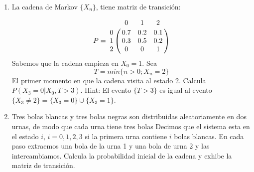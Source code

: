 \documentclass{report}
\begin{document}
\begin{enumerate}
\item La cadena de Markov $\{X_n\}$, tiene matriz de transición:

$$
P = \bordermatrix{~ & 0   & 1   & 2 \cr
                  0 & 0.7 & 0.2 & 0.1 \cr
                  1 & 0.3 & 0.5 & 0.2 \cr
                  2 & 0   & 0   & 1 \cr             
                  }
$$
Sabemos que la cadena empieza en $X_0=1$. Sea
$$
T = min\{n>0; X_n =2\}
$$
El primer momento en que la cadena visita al estado 2. Calcula $P(X_3=0\vert X_0, T>3)$.
Hint: El evento $\{T>3\}$ es igual al evento $\{X_3\neq 2\}=\{X_3=0\}\cup\{X_3=1\}$.
\item Tres bolas blancas y tres bolas negras son distribuidas aleatoriamente en dos urnas, de modo que cada urna tiene tres bolas Decimos que el sistema esta en el estado $i$, $i = 0,1,2,3$ si la primera urna contiene $i$ bolas blancas. En cada paso extraemos una bola de la urna 1 y una bola de urna 2 y las intercambiamos. Calcula la probabilidad inicial de la cadena y exhibe la matriz de transición.

\end{enumerate}
\end{document}
